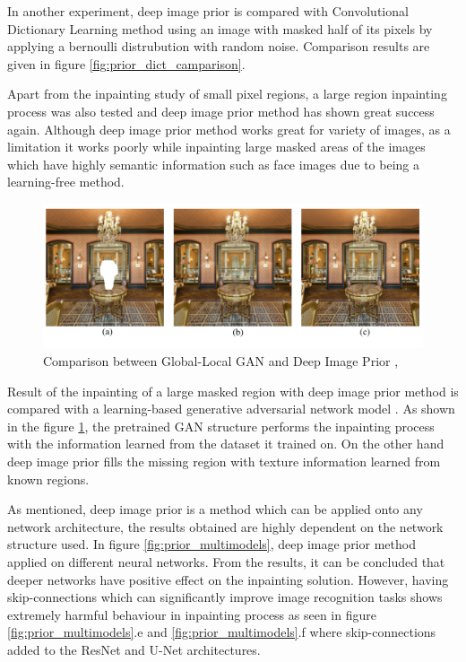 In another experiment, deep image prior is compared with Convolutional Dictionary Learning method \cite{conv_dict_learning} using an image with masked half of its pixels by applying a bernoulli distrubution \cite{bernoulli} with random noise. Comparison results are given in figure \ref{fig:prior_dict_camparison}.

Apart from the inpainting study of small pixel regions, a large region inpainting process was also tested and deep image prior method has shown great success again. Although deep image prior method works great for variety of images, as a limitation it works poorly while inpainting large masked areas of the images which have highly semantic information such as face images due to being a learning-free method.

\begin{figure}[h]
    \centering
    \includegraphics[width=13cm]{figures/chapter4/imprior3.png}
    \caption{Comparison between Global-Local GAN and Deep Image Prior \cite{Iizuka2017}, \cite{deep_image_prior}}
    \label{fig:prior_gan_comparison}
\end{figure}

Result of the inpainting of a large masked region with deep image prior method is compared with a learning-based generative adversarial network model \cite{Iizuka2017}. As shown in the figure \ref{fig:prior_gan_comparison}, the pretrained GAN structure performs the inpainting process with the information learned from the dataset it trained on. On the other hand deep image prior fills the missing region with texture information learned from known regions.

As mentioned, deep image prior is a method which can be applied onto any network architecture, the results obtained are highly dependent on the network structure used. In figure \ref{fig:prior_multimodels}, deep image prior method applied on different neural networks. From the results, it can be concluded that deeper networks have positive effect on the inpainting solution. However, having skip-connections which can significantly improve image recognition tasks shows extremely harmful behaviour in inpainting process as seen in figure \ref{fig:prior_multimodels}.e and \ref{fig:prior_multimodels}.f where skip-connections added to the ResNet \cite{deep_residual_recognition} and U-Net \cite{unet} architectures.

